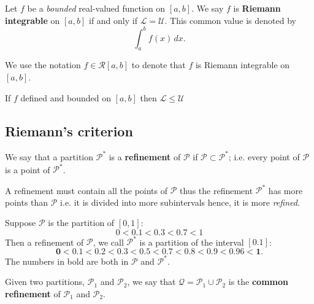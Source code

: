 \documentclass[12pt, a4paper]{article}
\begin{document}
\begin{definition}
    Let \(f\) be a \textit{bounded} real-valued function on \([a,b]\). We say \(f\) is \textbf{Riemann integrable} on \([a,b]\) if and only if \(\mathcal{L}=\mathcal{U}\). This common value is denoted by
    \[\int_a^b f(x) \, dx.\]
\end{definition}

\begin{mdremark}
    We use the notation \(f \in \mathcal{R}[a,b]\) to denote that \(f\) is Riemann integrable on \([a,b]\).
\end{mdremark}

\begin{corollary}
    If \(f\) defined and bounded on \([a,b]\) then \(\mathcal{L} \leq \mathcal{U}\)
\end{corollary}

\subsection{Riemann's criterion}

\begin{definition}
    We say that a partition \(\mathcal{P}^*\) is a \textbf{refinement} of \(\mathcal{P}\) if \(\mathcal{P} \subset \mathcal{P}^*\); i.e. every point of \(\mathcal{P}\) is a point of \(\mathcal{P}^*\).
\end{definition}

\begin{mdnote}
    A refinement must contain all the points of \(\mathcal{P}\) thus the refinement \(\mathcal{P}^*\) has more points than \(\mathcal{P}\) i.e. it is divided into more subintervals hence, it is more \textit{refined}.
\end{mdnote}

\begin{mdexample}
    Suppose \(\mathcal{P}\) is the partition of \([0,1]\):
    \[0<0.1<0.3<0.7<1\]
    Then a refinement of \(\mathcal{P}\), we call \(\mathcal{P}^*\) is a partition of the interval \([0.1]\):
    \[\mathbf{0}<\mathbf{0.1}<0.2<\mathbf{0.3}<0.5<\mathbf{0.7}<0.8<0.9<0.96<\mathbf{1}.\]
    The numbers in bold are both in \(\mathcal{P}\) and \(\mathcal{P}^*\). 
\end{mdexample}

\begin{definition}
    Given two partitions, \(\mathcal{P}_1\) and \(\mathcal{P}_2\), we say that \(\mathcal{Q}=\mathcal{P}_1 \cup \mathcal{P}_2\) is the \textbf{common refinement} of \(\mathcal{P}_1\) and \(\mathcal{P}_2\).
\end{definition}
\end{document}
